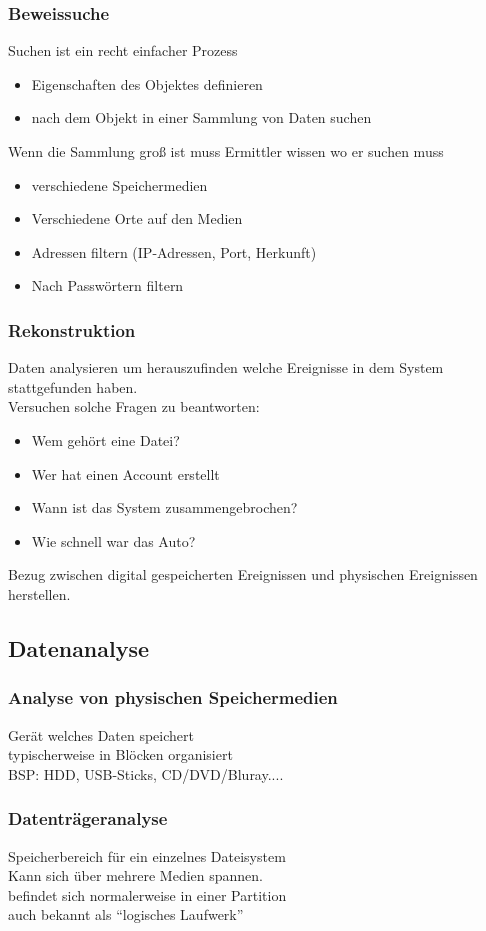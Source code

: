 \documentclass{article} %
\begin{document}
\subsubsection{Beweissuche}
Suchen ist ein recht einfacher Prozess
\begin{itemize}
	\item Eigenschaften des Objektes definieren
    \item nach dem Objekt in einer Sammlung von Daten suchen
\end{itemize}
Wenn die Sammlung groß ist muss Ermittler wissen wo er suchen muss
\begin{itemize}
	\item verschiedene Speichermedien
    \item Verschiedene Orte auf den Medien
    \item Adressen filtern (IP-Adressen, Port, Herkunft)
    \item Nach Passwörtern filtern
\end{itemize}

\subsubsection{Rekonstruktion}
Daten analysieren um herauszufinden welche Ereignisse in dem System stattgefunden haben.\\
Versuchen solche Fragen zu beantworten:
\begin{itemize}
	\item Wem gehört eine Datei?
    \item Wer hat einen Account erstellt
    \item Wann ist das System zusammengebrochen?
    \item Wie schnell war das Auto?
\end{itemize}
Bezug zwischen digital gespeicherten Ereignissen und physischen Ereignissen herstellen.
\subsection{Datenanalyse}
\subsubsection{Analyse von physischen Speichermedien}
Gerät welches Daten speichert\\
typischerweise in Blöcken organisiert\\
BSP: HDD, USB-Sticks, CD/DVD/Bluray....
\subsubsection{Datenträgeranalyse}
Speicherbereich für ein einzelnes Dateisystem\\
Kann sich über mehrere Medien spannen.\\
befindet sich normalerweise in einer Partition\\
auch bekannt als "`logisches Laufwerk"'
\end{document}

